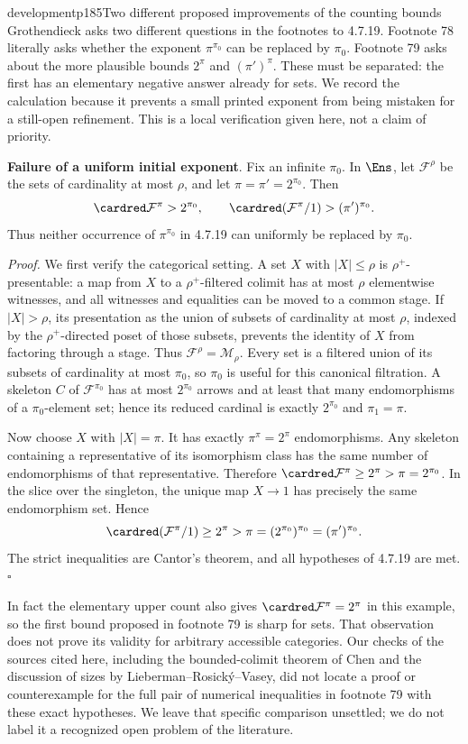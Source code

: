 \begin{dcomment}{development}{p185}{Two different proposed improvements of the counting bounds}
Grothendieck asks two different questions in the footnotes to 4.7.19. Footnote 78 literally asks whether the exponent $\pi^{\pi_0}$ can be replaced by $\pi_0$. Footnote 79 asks about the more plausible bounds $2^\pi$ and $(\pi')^\pi$. These must be separated: the first has an elementary negative answer already for sets. We record the calculation because it prevents a small printed exponent from being mistaken for a still-open refinement. This is a local verification given here, not a claim of priority.

\textbf{Failure of a uniform initial exponent}\ours.
Fix an infinite $\pi_0$. In $\Ens$, let $\mathcal F^\rho$ be the sets of cardinality at most $\rho$, and let $\pi=\pi'=2^{\pi_0}$. Then
\[
 \cardred\mathcal F^\pi>2^{\pi_0},
 \qquad
 \cardred(\mathcal F^\pi/1)>(\pi')^{\pi_0}.
\]
Thus neither occurrence of $\pi^{\pi_0}$ in 4.7.19 can uniformly be replaced by $\pi_0$.

\textit{Proof.} We first verify the categorical setting. A set $X$ with $|X|\leq\rho$ is $\rho^+$-presentable: a map from $X$ to a $\rho^+$-filtered colimit has at most $\rho$ elementwise witnesses, and all witnesses and equalities can be moved to a common stage. If $|X|>\rho$, its presentation as the union of subsets of cardinality at most $\rho$, indexed by the $\rho^+$-directed poset of those subsets, prevents the identity of $X$ from factoring through a stage. Thus $\mathcal F^\rho=\mathcal M_\rho$. Every set is a filtered union of its subsets of cardinality at most $\pi_0$, so $\pi_0$ is useful for this canonical filtration. A skeleton $C$ of $\mathcal F^{\pi_0}$ has at most $2^{\pi_0}$ arrows and at least that many endomorphisms of a $\pi_0$-element set; hence its reduced cardinal is exactly $2^{\pi_0}$ and $\pi_1=\pi$.

Now choose $X$ with $|X|=\pi$. It has exactly $\pi^\pi=2^\pi$ endomorphisms. Any skeleton containing a representative of its isomorphism class has the same number of endomorphisms of that representative. Therefore $\cardred\mathcal F^\pi\geq2^\pi>\pi=2^{\pi_0}$. In the slice over the singleton, the unique map $X\to1$ has precisely the same endomorphism set. Hence
\[
 \cardred(\mathcal F^\pi/1)\geq2^\pi
 >\pi=(2^{\pi_0})^{\pi_0}=(\pi')^{\pi_0}.
\]
The strict inequalities are Cantor's theorem, and all hypotheses of 4.7.19 are met.\hfill$\square$

In fact the elementary upper count also gives $\cardred\mathcal F^\pi=2^\pi$ in this example, so the first bound proposed in footnote 79 is sharp for sets. That observation does not prove its validity for arbitrary accessible categories. Our checks of the sources cited here, including the bounded-colimit theorem of Chen and the discussion of sizes by Lieberman--Rosick\'y--Vasey, did not locate a proof or counterexample for the full pair of numerical inequalities in footnote 79 with these exact hypotheses. We leave that specific comparison unsettled; we do not label it a recognized open problem of the literature.
\end{dcomment}

